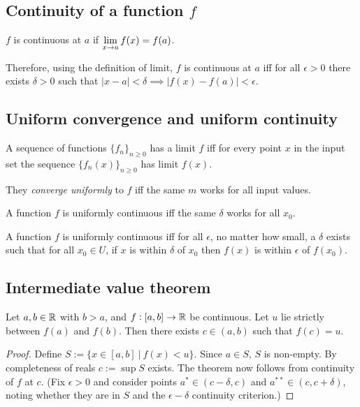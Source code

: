 \subsection{Continuity of a function $f$}

\begin{definition*}
$f$ is continuous at $a$ if $\LimEq{f(x)}{f(a)}{x}{a}$.
\end{definition*}

Therefore, using the definition of limit, $f$ is continuous at $a$ iff for all $\epsilon > 0$
there exists $\delta > 0$ such that $|x - a| < \delta \implies |f(x) - f(a)| < \epsilon$.

\subsection{Uniform convergence and uniform continuity}

\begin{definition*}
A sequence of functions $\{f_n\}_{n\geq 0}$ has a limit $f$ iff for every point
$x$ in the input set the sequence $\{f_n(x)\}_{n\geq 0}$ has limit $f(x)$.

They \textit{converge uniformly} to $f$ iff the same $m$ works for all input
values.
\end{definition*}

\begin{definition*}
A function $f$ is uniformly continuous iff the same $\delta$ works for all $x_0$.

A function $f$ is uniformly continuous iff for all $\epsilon$, no matter how
small, a $\delta$ exists such that for all $x_0 \in U$, if $x$ is within
$\delta$ of $x_0$ then $f(x)$ is within $\epsilon$ of $f(x_0)$.
\end{definition*}

\subsection{Intermediate value theorem}
\begin{theorem*}
  Let $a, b \in \R$ with $b > a$, and $f:[a,b] \to \R$ be continuous. Let $u$ lie strictly between
  $f(a)$ and $f(b)$. Then there exists $c \in (a, b)$ such that $f(c) = u$.
\end{theorem*}

\begin{proof}
  Define $S := \{x \in [a, b] ~|~ f(x) < u\}$. Since $a \in S$, $S$ is non-empty. By completeness
  of reals $c := \sup S$ exists. The theorem now follows from continuity of $f$ at $c$. (Fix
  $\epsilon > 0$ and consider points $a^* \in (c - \delta, c)$ and $a^{**} \in (c, c + \delta)$,
  noting whether they are in $S$ and the $\epsilon-\delta$ continuity criterion.)
\end{proof}


